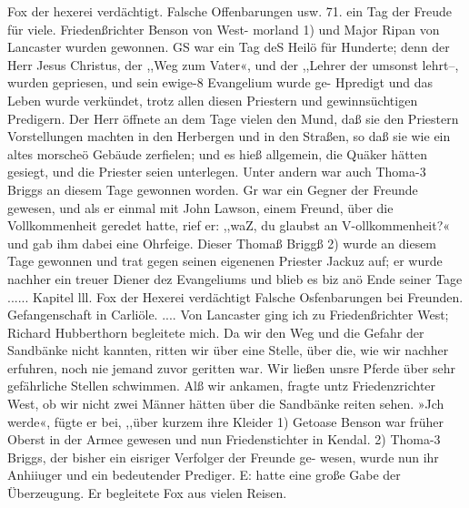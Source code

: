 Fox der hexerei verdächtigt. Falsche Offenbarungen usw. 71.
ein Tag der Freude für viele. Friedenßrichter Benson von West-
morland 1) und Major Ripan von Lancaster wurden gewonnen.
GS war ein Tag deS Heilö für Hunderte; denn der Herr Jesus
Christus, der ,,Weg zum Vater«, und der ,,Lehrer der umsonst
lehrt--, wurden gepriesen, und sein ewige-8 Evangelium wurde ge-
Hpredigt und das Leben wurde verkündet, trotz allen diesen Priestern
und gewinnsüchtigen Predigern. Der Herr öffnete an dem Tage
vielen den Mund, daß sie den Priestern Vorstellungen machten
in den Herbergen und in den Straßen, so daß sie wie ein altes
morscheö Gebäude zerfielen; und es hieß allgemein, die Quäker
hätten gesiegt, und die Priester seien unterlegen. Unter andern
war auch Thoma-3 Briggs an diesem Tage gewonnen worden. Gr
war ein Gegner der Freunde gewesen, und als er einmal mit
John Lawson, einem Freund, über die Vollkommenheit geredet hatte,
rief er: ,,waZ, du glaubst an V-ollkommenheit?« und gab ihm dabei
eine Ohrfeige. Dieser Thomaß Briggß 2) wurde an diesem Tage
gewonnen und trat gegen seinen eigenenen Priester Jackuz auf; er
wurde nachher ein treuer Diener dez Evangeliums und blieb es
biz anö Ende seiner Tage ......
Kapitel lll.
Fox der Hexerei verdächtigt Falsche Osfenbarungen bei Freunden.
Gefangenschaft in Carliöle.
.... Von Lancaster ging ich zu Friedenßrichter West; Richard
Hubberthorn begleitete mich. Da wir den Weg und die Gefahr
der Sandbänke nicht kannten, ritten wir über eine Stelle, über
die, wie wir nachher erfuhren, noch nie jemand zuvor geritten
war. Wir ließen unsre Pferde über sehr gefährliche Stellen
schwimmen. Alß wir ankamen, fragte untz Friedenzrichter West,
ob wir nicht zwei Männer hätten über die Sandbänke reiten
sehen. »Jch werde«, fügte er bei, ,,über kurzem ihre Kleider
1) Getoase Benson war früher Oberst in der Armee gewesen und nun
Friedenstichter in Kendal.
2) Thoma-3 Briggs, der bisher ein eisriger Verfolger der Freunde ge-
wesen, wurde nun ihr Anhiiuger und ein bedeutender Prediger. E: hatte eine
große Gabe der Überzeugung. Er begleitete Fox aus vielen Reisen.


